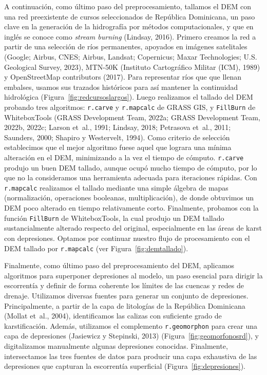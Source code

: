 \documentclass[spanish]{article}
\begin{document}
A continuación, como último paso del preprocesamiento, tallamos el DEM
con una red preexistente de cursos seleccionados de República
Dominicana, un paso clave en la generación de la hidrografía por métodos
computacionales, y que en inglés se conoce como \emph{stream burning}
(Lindsay, 2016). Primero creamos la red a partir de una selección de
ríos permanentes, apoyados en imágenes satelitales (Google; Airbus,
CNES; Airbus, Landsat; Copernicus; Maxar Technologies; U.S. Geological
Survey, 2023), MTN-50K (Instituto Cartográfico Militar (ICM), 1989) y
OpenStreetMap contributors (2017). Para representar ríos que que llenan
embalses, usamos sus trazados históricos para así mantener la
continuidad hidrológica (Figura~\ref{fig:redcursoslargos}). Luego
realizamos el tallado del DEM probando tres algoritmos: \texttt{r.carve}
y \texttt{r.mapcalc} de GRASS GIS, y \texttt{FillBurn} de WhiteboxTools
(GRASS Development Team, 2022a; GRASS Development Team, 2022b, 2022c;
Larson et~al., 1991; Lindsay, 2018; Petrasova et~al., 2011; Saunders,
2000; Shapiro y Westervelt, 1994). Como criterio de selección
establecimos que el mejor algoritmo fuese aquel que lograra una mínima
alteración en el DEM, minimizando a la vez el tiempo de cómputo.
\texttt{r.carve} produjo un buen DEM tallado, aunque ocupó mucho tiempo
de cómputo, por lo que no la consideramos una herramienta adecuada para
iteraciones rápidas. Con \texttt{r.mapcalc} realizamos el tallado
mediante una simple álgebra de mapas (normalización, operaciones
booleanas, multiplicación), de donde obtuvimos un DEM poco alterado en
tiempo relativamente corto. Finalmente, probamos con la función
\texttt{FillBurn} de WhiteboxTools, la cual produjo un DEM tallado
sustancialmente alterado respecto del original, especialmente en las
áreas de karst con depresiones. Optamos por continuar nuestro flujo de
procesamiento con el DEM tallado por \texttt{r.mapcalc} (ver
Figura~\ref{fig:demtallado}).

Finalmente, como último paso del preprocesamiento del DEM, aplicamos
algoritmos para superponer depresiones al modelo, un paso esencial para
dirigir la escorrentía y definir de forma coherente los límites de las
cuencas y redes de drenaje. Utilizamos diversas fuentes para generar un
conjunto de depresiones. Principalmente, a partir de la capa de
litologías de la República Dominicana (Mollat et~al., 2004),
identificamos las calizas con suficiente grado de karstificación.
Además, utilizamos el complemento \texttt{r.geomorphon} para crear una
capa de depresiones (Jasiewicz y Stepinski, 2013)
(Figura~\ref{fig:geomorfonosrd}), y digitalizamos manualmente algunas
depresiones conocidas. Finalmente, intersectamos las tres fuentes de
datos para producir una capa exhaustiva de las depresiones que capturan
la escorrentía superficial (Figura~\ref{fig:depresiones}).
\end{document}
